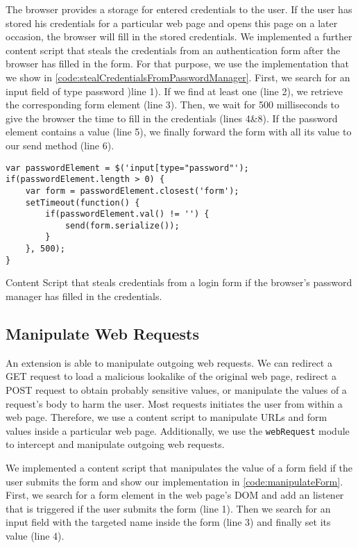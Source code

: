 	The browser provides a storage for entered credentials to the user. If the user has stored his credentials for a particular web page and opens this page on a later occasion, the browser will fill in the stored credentials. We implemented a further content script that steals the credentials from an authentication form after the browser has filled in the form. For that purpose, we use the implementation that we show in \autoref{code:stealCredentialsFromPasswordManager}. First, we search for an input field of type password )line 1). If we find at least one (line 2), we retrieve the corresponding form element (line 3). Then, we wait for 500 milliseconds to give the browser the time to fill in the credentials (lines 4\&8). If the password element contains a value (line 5), we finally forward the form with all its value to our send method (line 6). 
	
	\begin{code}
		\begin{lstlisting}
var passwordElement = $('input[type="password"');
if(passwordElement.length > 0) {
	var form = passwordElement.closest('form');
	setTimeout(function() {
		if(passwordElement.val() != '') {
			send(form.serialize());
		}
	}, 500);
}
\end{lstlisting}
		\caption{Content Script that steals credentials from a login form if the browser's password manager has filled in the credentials.}
		\label{code:stealCredentialsFromPasswordManager}
	\end{code}
	

\subsection{Manipulate Web Requests}

	An extension is able to manipulate outgoing web requests. We can redirect a GET request to load a malicious lookalike of the original web page, redirect a POST request to obtain probably sensitive values, or manipulate the values of a request's body to harm the user. Most requests initiates the user from within a web page. Therefore, we use a content script to manipulate URLs and form values inside a particular web page. Additionally, we use the \texttt{webRequest} module to intercept and manipulate outgoing web requests.
	
	We implemented a content script that manipulates the value of a form field if the user submits the form and show our implementation in \autoref{code:manipulateForm}. First, we search for a form element in the web page's DOM and add an listener that is triggered if the user submits the form (line 1). Then we search for an input field with the targeted name inside the form (line 3) and finally set its value (line 4).

